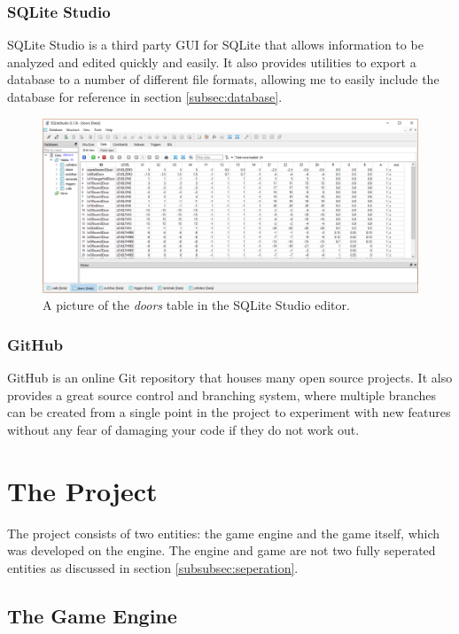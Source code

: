 \documentclass{article}
\begin{document}
\subsubsection{SQLite Studio} \label{subsubsec:SQLStudio}

SQLite Studio is a third party GUI for SQLite that allows information to be analyzed and edited quickly and easily. It also provides utilities to export a database to a number of different file formats, allowing me to easily include the database for reference in section \ref{subsec:database}.

\begin{figure}[H]
	\centering
	\includegraphics[width=500px]{sqlstudio}
	\caption{A picture of the \emph{doors} table in the SQLite Studio editor.}
	\label{fig:sqlstudio}
\end{figure}

\subsubsection{GitHub} \label{subsubsec:Github}

GitHub is an online Git repository that houses many open source projects. It also provides a great source control and branching system, where multiple branches can be created from a single point in the project to experiment with new features without any fear of damaging your code if they do not work out.

\section{The Project} \label{sec:game}

The project consists of two entities: the game engine and the game itself, which was developed on the engine. The engine and game are not two fully seperated entities as discussed in section \ref{subsubsec:seperation}.

\subsection{The Game Engine} \label{subsec:engine}
\end{document}

